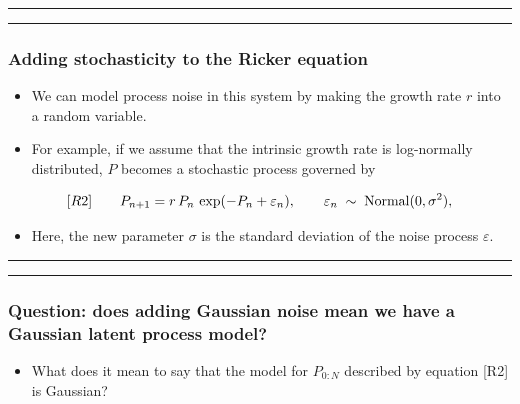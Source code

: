 \documentclass[]{article}
\providecommand{\tightlist}{%
  \setlength{\itemsep}{0pt}\setlength{\parskip}{0pt}}
\begin{document}
\begin{center}\rule{0.5\linewidth}{\linethickness}\end{center}

\begin{center}\rule{0.5\linewidth}{\linethickness}\end{center}

\subsubsection{Adding stochasticity to the Ricker
equation}\label{adding-stochasticity-to-the-ricker-equation}

\begin{itemize}
\item
  We can model process noise in this system by making the growth rate
  \(r\) into a random variable.
\item
  For example, if we assume that the intrinsic growth rate is
  log-normally distributed, \(P\) becomes a stochastic process governed
  by
\end{itemize}

$$[R2]
\quad\quad \displaystyle P_{n+1} = r\,P_{n}\,\exp(-P_{n}+\varepsilon_{n}), \qquad \varepsilon_{n}\;\sim\;\mathrm{Normal}(0,\sigma^2),$$

\begin{itemize}
\tightlist
\item
  Here, the new parameter \(\sigma\) is the standard deviation of the
  noise process \(\varepsilon\).
\end{itemize}

\begin{center}\rule{0.5\linewidth}{\linethickness}\end{center}

\begin{center}\rule{0.5\linewidth}{\linethickness}\end{center}

\subsubsection{Question: does adding Gaussian noise mean we have a
Gaussian latent process
model?}\label{question-does-adding-gaussian-noise-mean-we-have-a-gaussian-latent-process-model}

\begin{itemize}
\tightlist
\item
  What does it mean to say that the model for \(P_{0:N}\) described by
  equation {[}R2{]} is Gaussian?
\end{itemize}
\end{document}
